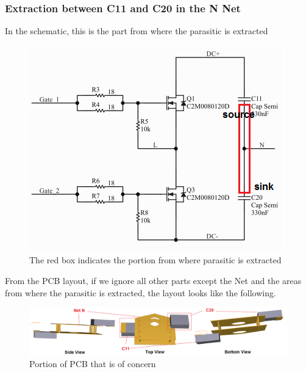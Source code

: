 \subsubsection{Extraction between C11 and C20 in the N Net}
\label{sec:extraction_c11_c20}

In the schematic, this is the part from where the parasitic is extracted

\begin{figure} [H]
  \centering
  \includegraphics[width=\linewidth]{pictures/examples/schematic3.png}
  \caption{The red box indicates the portion from where parasitic is extracted}
  \label{fig:schematic3}
\end{figure}

From the PCB layout, if we ignore all other parts except the Net and the areas from where the parasitic is extracted, the layout looks like the following.

\begin{figure} [H]
  \centering
  \includegraphics[width=\linewidth]{pictures/examples/PCB_cut_3.png}
  \caption{Portion of PCB that is of concern}
  \label{fig:PCB_cut3}
\end{figure}


